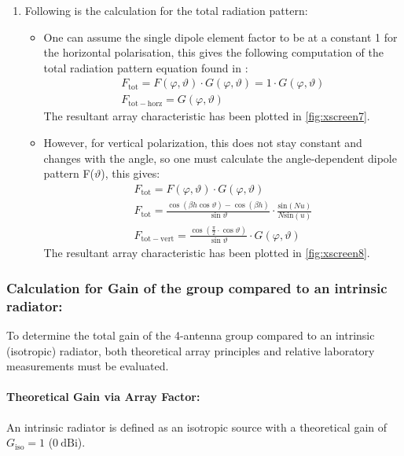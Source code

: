 \begin{enumerate}
	\item Following is the calculation for the total radiation pattern:
	\begin{itemize}
		\item One can assume the single dipole element factor to be at a constant 1 for the horizontal polarisation, this gives the following computation of the total radiation pattern equation found in \cite{lec-script}:
		\begin{gather}
			F_{\mathrm{tot}} = F(\varphi, \vartheta)\cdot G(\varphi, \vartheta) = 1\cdot G(\varphi, \vartheta) \nonumber \\
			\boxed {F_{\mathrm{tot-horz}} = G(\varphi, \vartheta)}			\label{horizontal_pattern}
		\end{gather}
		The resultant array characteristic has been plotted in \ref{fig:xscreen7}.
		\item However, for vertical polarization, this does not stay constant and changes with the angle, so one must calculate the angle-dependent dipole pattern F($\vartheta$), this gives:
		\begin{gather}
			F_{\mathrm{tot}} = F(\varphi, \vartheta)\cdot G(\varphi, \vartheta) \nonumber \\
			{F_{\mathrm{tot}} = \frac{\cos(\beta h \cos \vartheta)-\cos(\beta h)}{\sin \vartheta} \cdot \frac{\mathrm{sin}(Nu)}{N\mathrm{sin}(u)}} \nonumber \\
			\boxed {F_{\mathrm{tot-vert}} = \frac{\cos(\frac{\pi}{2}\cdot\cos{\vartheta})}{\sin \vartheta} \cdot G(\varphi, \vartheta)} \label{vertical_pattern}
		\end{gather}
		The resultant array characteristic has been plotted in \ref{fig:xscreen8}.
	\end{itemize}
\end{enumerate}

\subsubsection{\textbf{Calculation for Gain of the group compared to an intrinsic radiator:}}
To determine the total gain of the 4-antenna group compared to an intrinsic (isotropic) radiator, both theoretical array principles and relative laboratory measurements must be evaluated.

\paragraph{Theoretical Gain via Array Factor:}
An intrinsic radiator is defined as an isotropic source with a theoretical gain of $G_{\mathrm{iso}} = 1$ ($0\mathrm{\ dBi}$). 

